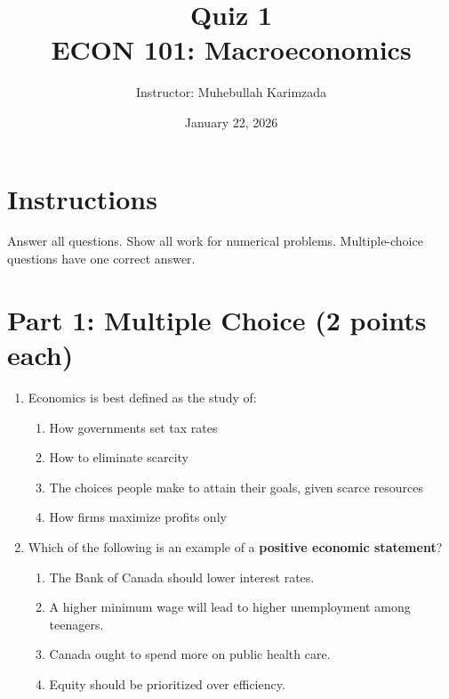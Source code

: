 \documentclass[12pt]{article}
\title{\textbf{Quiz 1} \vspace{ 0.4cm }\\ECON 101: Macroeconomics }
\author{Instructor: Muhebullah Karimzada}
\date{January 22,  2026}
\begin{document}
\maketitle

\section*{Instructions}
Answer all questions. Show all work for numerical problems. Multiple-choice questions have one correct answer.

\section*{Part 1: Multiple Choice (2 points each)}

\begin{enumerate}
    \item Economics is best defined as the study of:
    \begin{enumerate}[label=\Alph*.]
        \item How governments set tax rates  
        \item How to eliminate scarcity  
        \item The choices people make to attain their goals, given scarce resources  
        \item How firms maximize profits only  
    \end{enumerate}

    \item Which of the following is an example of a \textbf{positive economic statement}?  
    \begin{enumerate}[label=\Alph*.]
        \item The Bank of Canada should lower interest rates.  
        \item A higher minimum wage will lead to higher unemployment among teenagers.  
        \item Canada ought to spend more on public health care.  
        \item Equity should be prioritized over efficiency.  
    \end{enumerate}


\end{enumerate}
\end{document}
